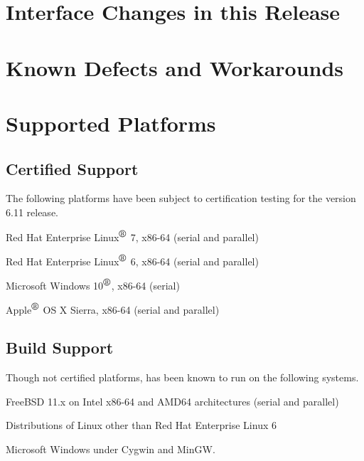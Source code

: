 \documentclass[letterpaper]{scrartcl}
\begin{document}
\newpage
\section{Interface Changes in this Release}



\newpage
\section{Known Defects and Workarounds}



\newpage
\section{Supported Platforms}
\subsection*{Certified Support}
The following platforms have been subject to certification testing for the
\Xyce{} version 6.11 release.
\begin{XyceItemize}
  \item Red Hat Enterprise Linux${}^{\mbox{\textregistered}}$ 7, x86-64 (serial and parallel)
  \item Red Hat Enterprise Linux${}^{\mbox{\textregistered}}$ 6, x86-64 (serial and parallel)
  \item Microsoft Windows 10${}^{\mbox{\textregistered}}$, x86-64 (serial)
  \item Apple${}^{\mbox{\textregistered}}$ OS X Sierra, x86-64 (serial and parallel)
\end{XyceItemize}

\subsection*{Build Support}
Though not certified platforms, \Xyce{} has been known to run on the following
systems.
\begin{XyceItemize}
  \item FreeBSD 11.x on Intel x86-64 and AMD64 architectures (serial
    and parallel)
  \item Distributions of Linux other than Red Hat Enterprise Linux 6
  \item Microsoft Windows under Cygwin and MinGW.
\end{XyceItemize}
\end{document}
